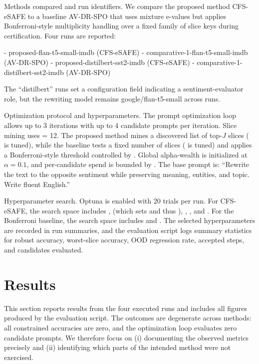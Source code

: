\documentclass{article} %
\begin{document}
Methods compared and run identifiers. We compare the proposed method CFS-eSAFE to a baseline AV-DR-SPO that uses mixture e-values but applies Bonferroni-style multiplicity handling over a fixed family of slice keys during certification. Four runs are reported:

- proposed-flan-t5-small-imdb (CFS-eSAFE)
- comparative-1-flan-t5-small-imdb (AV-DR-SPO)
- proposed-distilbert-sst2-imdb (CFS-eSAFE)
- comparative-1-distilbert-sst2-imdb (AV-DR-SPO)

The “distilbert” runs set a configuration field indicating a sentiment-evaluator role, but the rewriting model remains google/flan-t5-small across runs.

Optimization protocol and hyperparameters. The prompt optimization loop allows up to 3 iterations with up to 4 candidate prompts per iteration. Slice mining uses  = 12. The proposed method mines a discovered list of top-$J$ slices ( is tuned), while the baseline tests a fixed number of slices ( is tuned) and applies a Bonferroni-style threshold controlled by . Global alpha-wealth is initialized at $\alpha = 0.1$, and per-candidate spend is bounded by . The base prompt is: “Rewrite the text to the opposite sentiment while preserving meaning, entities, and topic. Write fluent English.”

Hyperparameter search. Optuna is enabled with 20 trials per run. For CFS-eSAFE, the search space includes ,  (which sets  and thus ), , , and . For the Bonferroni baseline, the search space includes  and . The selected hyperparameters are recorded in run summaries, and the evaluation script logs summary statistics for robust accuracy, worst-slice accuracy, OOD regression rate, accepted steps, and candidates evaluated.

\section{Results}\label{sec:results}
This section reports results from the four executed runs and includes all figures produced by the evaluation script. The outcomes are degenerate across methods: all constrained accuracies are zero, and the optimization loop evaluates zero candidate prompts. We therefore focus on (i) documenting the observed metrics precisely and (ii) identifying which parts of the intended method were not exercised.
\end{document}

